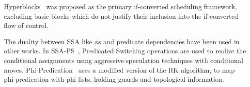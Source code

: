 Hyperblocks~\cite{Mahlke:1992:ECS:144965.144998} was proposed as the primary if-converted scheduling framework, excluding basic blocks which do not justify their inclusion into the if-converted flow of control.

The duality between SSA like $\phi$s and predicate dependencies have been used in other works. 
In SSA-PS~\cite{Jacome01clusteredvliw}, Predicated Switching operations are used to realize the conditional assignments using aggressive speculation techniques with conditional moves. 
Phi-Predication~\cite{Chuang:2003:CGO} uses a modified version of the RK algorithm, to map phi-predication with phi-lists, holding guards and topological information.












